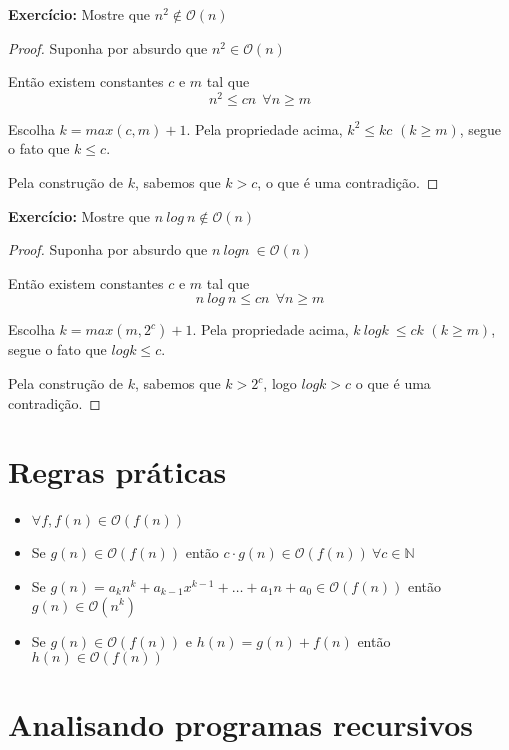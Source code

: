 \textbf{Exercício:} Mostre que $n^2  \not \in \mathcal{O}(n)$


\begin{proof}

Suponha por absurdo que  $n^2 \in \mathcal{O}(n)$

Então existem constantes $c$ e $m$ tal que
$$
n^2 \leq cn ~~\forall n \geq m
$$

Escolha $k = max(c, m) + 1$. Pela propriedade acima, $k^2 \leq kc$ $(k \geq m)$, segue o fato que $k \leq c$.

Pela construção de $k$, sabemos que $k > c$, o que é uma contradição. 

\end{proof}



\textbf{Exercício:} Mostre que $n ~log~ n  \not \in \mathcal{O}(n)$


\begin{proof}

Suponha por absurdo que  $n ~log n~ \in \mathcal{O}(n)$

Então existem constantes $c$ e $m$ tal que
$$
n~log~n \leq cn ~~\forall n \geq m
$$

Escolha $k = max(m, 2^c) + 1$. Pela propriedade acima, $k ~log k~ \leq ck$ $(k \geq m)$, segue o fato que $log k \leq c$.

Pela construção de $k$, sabemos que $k > 2^c$, logo $log k > c$ o que é uma contradição. 

\end{proof}


\section{Regras práticas}

\begin{itemize}
    \item $\forall f, f(n) \in \mathcal{O}(f(n))$
    \item Se $g(n) \in \mathcal{O}(f(n))$ então $c \cdot g(n) \in \mathcal{O}(f(n)) ~\forall c \in \mathbb{N}$
    \item Se $g(n) = a_kn^k + a_{k-1}x^{k-1} + \ldots + a_1n+ a_0 \in \mathcal{O}(f(n))$ então $g(n) \in \mathcal{O}(n^k)$
    \item Se $g(n) \in \mathcal{O}(f(n))$ e $h(n) =  g(n) + f(n)$ então $h(n) \in \mathcal{O}(f(n))$
\end{itemize}


\section{Analisando programas recursivos}

